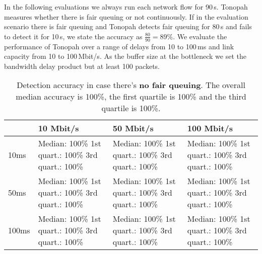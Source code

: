 \documentclass[conference]{IEEEtran}
\begin{document}
In the following evaluations we always run each network flow for 90\,s. Tonopah measures whether there is fair queuing or not continuously. 
If in the evaluation scenario there is fair queuing and Tonopah detects fair queuing for 80\,s and fails to detect it for 10\,s, we 
state the accuracy as $\frac{80}{90} = 89\%$. 
We evaluate the performance of Tonopah over a range of delays from 10 to 100\,ms and link capacity from 10 to 100\,Mbit/s. 
As the buffer size at the bottleneck we set the bandwidth delay product but at least 100 packets. 
\begin{table}
\begin{tabularx}{\columnwidth}{| l | X | X | X |}
\hline
& 10 Mbit/s & 50 Mbit/s & 100 Mbit/s \\ \hline
10ms & Median: 100\% \newline 1st quart.: 100\% \newline 3rd quart.: 100\% & Median: 100\% \newline 1st quart.: 100\% \newline 3rd quart.: 100\% & Median: 100\% \newline 1st quart.: 100\% \newline 3rd quart.: 100\%\\ \hline
50ms & Median: 100\% \newline 1st quart.: 100\% \newline 3rd quart.: 100\% & Median: 100\% \newline 1st quart.: 100\% \newline 3rd quart.: 100\% & Median: 100\% \newline 1st quart.: 100\% \newline 3rd quart.: 100\% \\ \hline
100ms & Median: 100\% \newline 1st quart.: 100\% \newline 3rd quart.: 100\% & Median: 100\% \newline 1st quart.: 100\% \newline 3rd quart.: 100\% & Median: 100\% \newline 1st quart.: 100\% \newline 3rd quart.: 100\% \\ \hline
\end{tabularx}
\caption{Detection accuracy in case there's \textbf{no fair queuing}.  The overall median accuracy is 100\%, the first quartile is 100\% and the third quartile is 100\%.}
\label{table:no_fq}
\end{table}
\end{document}
